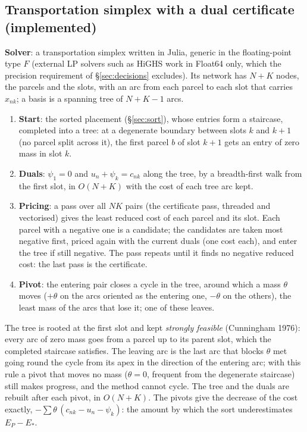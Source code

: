 \documentclass[11pt,a4paper]{article}
\begin{document}
\subsection{Transportation simplex with a dual certificate (implemented)}
\textbf{Solver}: a transportation simplex written in Julia, generic in the floating-point type $F$ (external LP solvers such as
HiGHS work in Float64 only, which the precision requirement of \S\ref{sec:decisions} excludes). Its network has $N+K$ nodes, the
parcels and the slots, with an arc from each parcel to each slot that carries $x_{nk}$; a basis is a spanning tree of $N+K-1$ arcs.
\begin{enumerate}
  \item \textbf{Start}: the sorted placement (\S\ref{sec:sort}), whose entries form a staircase, completed into a tree: at a
        degenerate boundary between slots $k$ and $k+1$ (no parcel split across it), the first parcel $b$ of slot $k+1$ gets an
        entry of zero mass in slot $k$.
  \item \textbf{Duals}: $\psi_1=0$ and $u_n+\psi_k=c_{nk}$ along the tree, by a breadth-first walk from the first slot, in
        $O(N+K)$ with the cost of each tree arc kept.
  \item \textbf{Pricing}: a pass over all $NK$ pairs (the certificate pass, threaded and vectorised) gives the least reduced cost
        of each parcel and its slot. Each parcel with a negative one is a candidate; the candidates are taken most negative
        first, priced again with the current duals (one cost each), and enter the tree if still negative. The pass repeats
        until it finds no negative reduced cost: the last pass is the certificate.
  \item \textbf{Pivot}: the entering pair closes a cycle in the tree, around which a mass $\theta$ moves ($+\theta$ on the arcs
        oriented as the entering one, $-\theta$ on the others), the least mass of the arcs that lose it; one of these leaves.
\end{enumerate}
The tree is rooted at the first slot and kept \emph{strongly feasible} (Cunningham 1976): every arc of zero mass goes from a
parcel up to its parent slot, which the completed staircase satisfies. The leaving arc is the last arc that blocks $\theta$
met going round the cycle from its apex in the direction of the entering arc; with this rule a pivot that moves no mass
($\theta=0$, frequent from the degenerate staircase) still makes progress, and the method cannot cycle. The tree and the duals
are rebuilt after each pivot, in $O(N+K)$. The pivots give the decrease of the cost exactly, $-\sum\theta\,(c_{nk}-u_n-\psi_k)$:
the amount by which the sort underestimates $E_P-E_*$.
\end{document}
